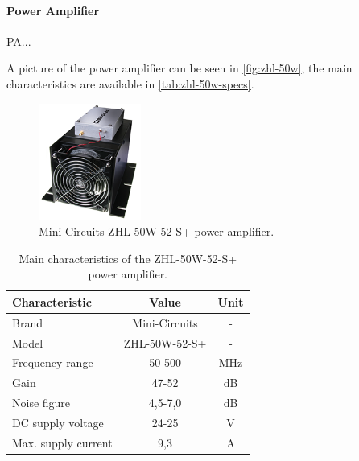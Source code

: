 \paragraph{Power Amplifier}

PA...

A picture of the power amplifier can be seen in \autoref{fig:zhl-50w}, the main characteristics are available in \autoref{tab:zhl-50w-specs}.

\begin{figure}[!ht]
    \begin{center}
        \includegraphics[width=0.3\textwidth]{figures/zhl-50w.png}
        \caption{Mini-Circuits ZHL-50W-52-S+ power amplifier.}
        \label{fig:zhl-50w}
    \end{center}
\end{figure}

\begin{table}[ht]
    \centering
    \begin{tabular}{lcc}
        \toprule[1.5pt]
        \textbf{Characteristic} & \textbf{Value}    & \textbf{Unit} \\
        \midrule
        Brand                   & Mini-Circuits     & - \\
        Model                   & ZHL-50W-52-S+     & - \\
        Frequency range         & 50-500            & MHz \\
        Gain                    & 47-52             & dB \\
        Noise figure            & 4,5-7,0           & dB \\
        DC supply voltage       & 24-25             & V \\
        Max. supply current     & 9,3               & A \\
        \bottomrule[1.5pt]
    \end{tabular}
    \caption{Main characteristics of the ZHL-50W-52-S+ power amplifier.}
    \label{tab:zhl-50w-specs}
\end{table}

